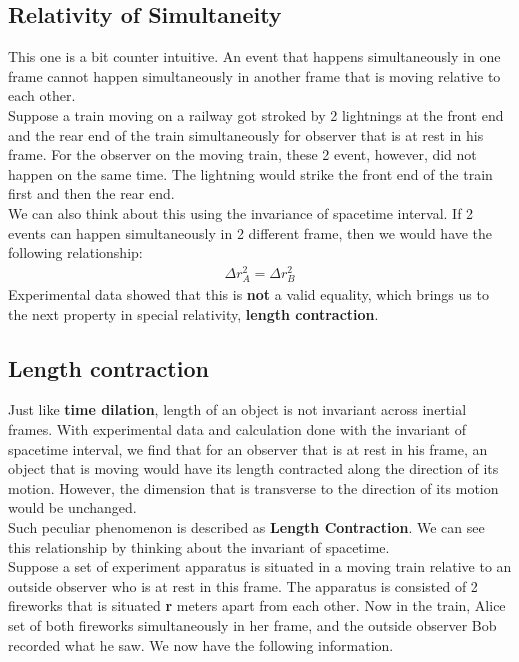 \documentclass[11pt,letterpaper]{book}
\begin{document}
\subsection{Relativity of Simultaneity}
This one is a bit counter intuitive. An event that happens simultaneously in one frame cannot happen simultaneously in another frame that is moving relative to each other. \\
 
Suppose a train moving on a railway got stroked by 2 lightnings at the front end and the rear end of the train simultaneously for observer that is at rest in his frame. For the observer on the moving train, these 2 event, however, did not happen on the same time. The lightning would strike the front end of the train first and then the rear end. 
\\

We can also think about this using the invariance of spacetime interval. If 2 events can happen simultaneously in 2 different frame, then we would have the following relationship:
\begin{align}
\Delta r_A^2 = \Delta r_B^2
\end{align}
Experimental data showed that this is \textbf{not} a valid equality, which brings us to the next property in special relativity, \textbf{length contraction}.
\subsection{Length contraction}
Just like \textbf{time dilation}, length of an object is not invariant across inertial frames. With experimental data and calculation done with the invariant of spacetime interval, we find that for an observer that is at rest in his frame, an object that is moving would have its length contracted along the direction of its motion. However, the dimension that is transverse to the direction of its motion would be unchanged. \\

Such peculiar phenomenon is described as \textbf{Length Contraction}. We can see this relationship by thinking about the invariant of spacetime. \\

Suppose a set of experiment apparatus is situated in a moving train relative to an outside observer who is at rest in this frame. The apparatus is consisted of 2 fireworks that is situated \textbf{r} meters apart from each other. Now in the train, Alice set of both fireworks simultaneously in her frame, and the outside observer Bob recorded what he saw. We now have the following information.
\\
\end{document}
